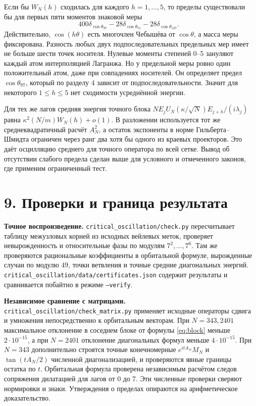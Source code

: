 \documentclass[11pt,a4paper]{article}
\newcommand{\sect}[1]{\section*{\sffamily\color{ink}#1}}
\newcommand{\subt}[1]{\par\medskip\noindent\textbf{#1.}\quad}
\begin{document}
Если бы \(W_N(h)\) сходилась для каждого \(h=1,\ldots,5\), то пределы существовали бы для первых пяти моментов знаковой меры
\[
  400\delta_{\cos\theta_{97}}-28\delta_{\cos\theta_{71}}
                                      -28\delta_{\cos\theta_{127}} .
\]
Действительно, \(\cos(h\theta)\) есть многочлен Чебышёва от \(\cos\theta\), а масса меры фиксирована. Разность любых двух подпоследовательных предельных мер имеет не больше шести точек носителя. Нулевые моменты степеней 0--5 зануляют каждый атом интерполяцией Лагранжа. Но у предельной меры ровно один положительный атом, даже при совпадениях носителей. Он определяет предел \(\cos\theta_{97}\), который по разделу 4 зависит от подпоследовательности. Значит для некоторого \(1\le h\le5\) нет сходимости усреднённой энергии.

Для тех же лагов средняя энергия точного блока \(N E_jU_N(\kappa/\sqrt N)E_{j+h}/(i\lambda_j)\) равна \(\kappa^2(N/m)W_N(h)+o(1)\). В разложении используется тот же среднеквадратичный расчёт \(A_N^2\), а остаток экспоненты в норме Гильберта--Шмидта ограничен через ранг два хотя бы одного из краевых проекторов. Это даёт осцилляцию среднего для точного оператора по всей сетке. Вывод об отсутствии слабого предела сделан выше для условного и отмеченного законов, где применим ограниченный тест.

\newpage
\sect{9. Проверки и граница результата}
\subt{Точное воспроизведение}
\texttt{critical\_oscillation/check.py} пересчитывает таблицу межузловых корней из исходных вейлевых меток, проверяет невырожденность и относительные фазы по модулям \(7^2,\ldots,7^6\). Там же проверяются рациональные коэффициенты в орбитальной формуле, вырожденные случаи по модулю \(49\), точки ветвления и точные средние диагональных энергий. \texttt{critical\_oscillation/data/certificates.json} содержит результаты и сравнивается побайтно в режиме \texttt{--verify}.

\subt{Независимое сравнение с матрицами}
\texttt{critical\_oscillation/check\_matrix.py} применяет исходные операторы сдвига и умножения непосредственно к орбитальным векторам. При \(N=343,2401\) максимальное отклонение в соседнем блоке от формулы \eqref{eq:block} меньше \(2\cdot10^{-15}\), а при \(N=2401\) отклонение диагональных формул меньше \(4\cdot10^{-15}\). При \(N=343\) дополнительно строятся точные конечномерные \(e^{itA_N}M_N\) и \(\tan(tA_N/2)\) численной диагонализацией, и проверяются явные границы остатка по \(t\). Орбитальная формула проверена независимым расчётом следов сопряжения дилатацией для лагов от 0 до 7. Эти численные проверки сверяют нормировки и знаки. Утверждения о пределах опираются на арифметическое доказательство.
\end{document}
